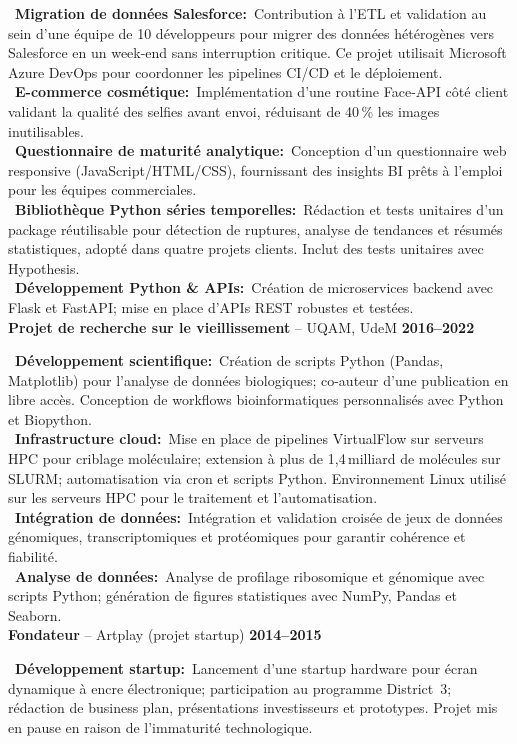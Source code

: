 \documentclass[a4paper,10pt]{article}
\newcommand{\resumeItem}[3]{%
  \noindent\textbf{#1} -- #2 \hfill \textbf{#3} \\
  \vspace{0.3em}
}
\newcommand{\jobItem}[2]{%
  \noindent
  \textbullet\ \textbf{#1\ifthenelse{\boolean{EN}}{}{ }:}~#2\vspace{0.3em} \\
}
\begin{document}
{{    \jobItem{Migration de données Salesforce}{Contribution à l'ETL et validation au sein d'une équipe de 10 développeurs pour migrer des données hétérogènes vers Salesforce en un week-end sans interruption critique. Ce projet utilisait Microsoft Azure DevOps pour coordonner les pipelines CI/CD et le déploiement.}
    \jobItem{E-commerce cosmétique}{Implémentation d'une routine Face-API côté client validant la qualité des selfies avant envoi, réduisant de 40\,\% les images inutilisables.}
    \jobItem{Questionnaire de maturité analytique}{Conception d'un questionnaire web responsive (JavaScript/HTML/CSS), fournissant des insights BI prêts à l'emploi pour les équipes commerciales.}
    \jobItem{Bibliothèque Python séries temporelles}{Rédaction et tests unitaires d'un package réutilisable pour détection de ruptures, analyse de tendances et résumés statistiques, adopté dans quatre projets clients. Inclut des tests unitaires avec Hypothesis.}
    \jobItem{Développement Python \& APIs}{Création de microservices backend avec Flask et FastAPI; mise en place d’APIs REST robustes et testées.}
    \vspace{1em}
    \resumeItem{Projet de recherche sur le vieillissement}{UQAM, UdeM}{2016–2022}
    \jobItem{Développement scientifique}{Création de scripts Python (Pandas, Matplotlib) pour l'analyse de données biologiques; co-auteur d’une publication en libre accès. Conception de workflows bioinformatiques personnalisés avec Python et Biopython.}
    \jobItem{Infrastructure cloud}{Mise en place de pipelines VirtualFlow sur serveurs HPC pour criblage moléculaire; extension à plus de 1,4 milliard de molécules sur SLURM; automatisation via cron et scripts Python. Environnement Linux utilisé sur les serveurs HPC pour le traitement et l'automatisation.}
    \jobItem{Intégration de données}{Intégration et validation croisée de jeux de données génomiques, transcriptomiques et protéomiques pour garantir cohérence et fiabilité.}
    \jobItem{Analyse de données}{Analyse de profilage ribosomique et génomique avec scripts Python; génération de figures statistiques avec NumPy, Pandas et Seaborn.}
    \vspace{1em}
    \resumeItem{Fondateur}{Artplay (projet startup)}{2014–2015}
    \jobItem{Développement startup}{Lancement d'une startup hardware pour écran dynamique à encre électronique; participation au programme District 3; rédaction de business plan, présentations investisseurs et prototypes. Projet mis en pause en raison de l'immaturité technologique.}
    \vspace{1em}
}}
\end{document}
